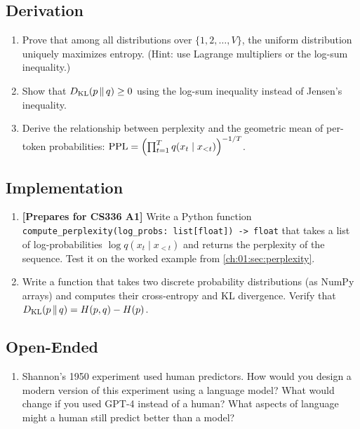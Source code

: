 \subsection*{Derivation}
\begin{enumerate}
  \item Prove that among all distributions over $\{1, 2, \ldots, V\}$, the uniform distribution uniquely maximizes entropy. (Hint: use Lagrange multipliers or the log-sum inequality.)

  \item Show that $D_{\mathrm{KL}}\!\left(p \,\|\, q\right) \geq 0$ using the log-sum inequality instead of Jensen's inequality.

  \item Derive the relationship between perplexity and the geometric mean of per-token probabilities: $\operatorname{PPL} = \left(\prod_{t=1}^T q(x_t \mid x_{<t})\right)^{-1/T}$.
\end{enumerate}

\subsection*{Implementation}
\begin{enumerate}
  \item \textbf{[Prepares for CS336 A1]} Write a Python function \texttt{compute\_perplexity(log\_probs: list[float]) -> float} that takes a list of log-probabilities $\log q(x_t \mid x_{<t})$ and returns the perplexity of the sequence. Test it on the worked example from \cref{ch:01:sec:perplexity}.

  \item Write a function that takes two discrete probability distributions (as NumPy arrays) and computes their cross-entropy and KL divergence. Verify that $D_{\mathrm{KL}}\!\left(p \,\|\, q\right) = H(p,q) - H(p)$.
\end{enumerate}

\subsection*{Open-Ended}
\begin{enumerate}
  \item Shannon's 1950 experiment used human predictors. How would you design a modern version of this experiment using a language model? What would change if you used GPT-4 instead of a human? What aspects of language might a human still predict better than a model?
\end{enumerate}


